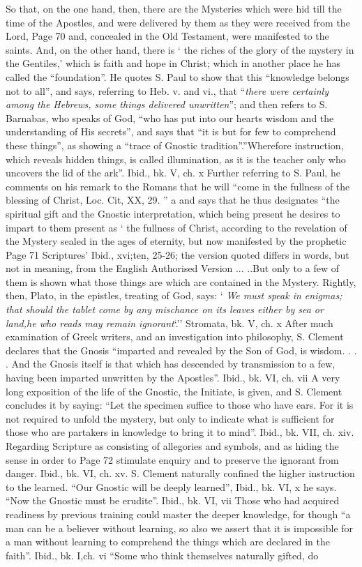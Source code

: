 \begin{quotationx}
So that, on the one hand, then, there are the Mysteries which were hid till the time of the Apostles, and were delivered by them as they were received from the Lord, Page 70 and, concealed in the Old Testament, were manifested to the saints. And, on the other hand, there is ` the riches of the glory of the mystery in the Gentiles,' which is faith and hope in Christ; which in another place he has called the ``foundation''. He quotes S. Paul to show that this ``knowledge belongs not to all'', and says, referring to Heb. v. and vi., that ``\emph{there were certainly among the Hebrews, some things delivered unwritten}''; and then refers to S. Barnabas, who speaks of God, ``who has put into our hearts wisdom and the understanding of His secrets'', and says that ``it is but for few to comprehend these things'', as showing a ``trace of Gnostic tradition''.''Wherefore instruction, which reveals hidden things, is called illumination, as it is the teacher only who uncovers the lid of the ark''. Ibid., bk. V, ch. x Further referring to S. Paul, he comments on his remark to the Romans that he will ``come in the fullness of the blessing of Christ, Loc. Cit, XX, 29. '' a and says that he thus designates ``the spiritual gift and the Gnostic interpretation, which being present he desires to impart to them present as ` the fullness of Christ, according to the revelation of the Mystery sealed in the ages of eternity, but now manifested by the prophetic Page 71 Scriptures' Ibid., xvi;ten, 25-26; the version quoted differs in words, but not in meaning, from the English Authorised Version ... ..But only to a few of them is shown what those things are which are contained in the Mystery. Rightly, then, Plato, in the epistles, treating of God, says: ` \emph{We must speak in enigmas; that should the tablet come by any mischance on its leaves either by sea or land,he who reads may remain ignorant}`.'' Stromata, bk. V, ch. x After much examination of Greek writers, and an investigation into philosophy, S. Clement declares that the Gnosis ``imparted and revealed by the Son of God, is wisdom. . . . And the Gnosis itself is that which has descended by transmission to a few, having been imparted unwritten by the Apostles''. Ibid., bk. VI, ch. vii A very long exposition of the life of the Gnostic, the Initiate, is given, and S. Clement concludes it by saying: ``Let the specimen suffice to those who have ears. For it is not required to unfold the mystery, but only to indicate what is sufficient for those who are partakers in knowledge to bring it to mind''. Ibid., bk. VII, ch. xiv. Regarding Scripture as consisting of allegories and symbols, and as hiding the sense in order to Page 72 stimulate enquiry and to preserve the ignorant from danger. Ibid., bk. VI, ch. xv. S. Clement naturally confined the higher instruction to the learned. ``Our Gnostic will be deeply learned'', Ibid., bk. VI, x he says. ``Now the Gnostic must be erudite''. Ibid., bk. VI, vii Those who had acquired readiness by previous training could master the deeper knowledge, for though ``a man can be a believer without learning, so also we assert that it is impossible for a man without learning to comprehend the things which are declared in the faith''. Ibid., bk. I,ch. vi ``Some who think themselves naturally gifted, do 
\end{quotationx}

